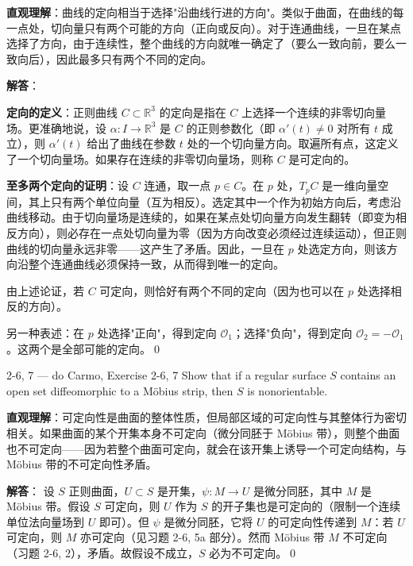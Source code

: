 \begin{solution}
\textbf{直观理解}：曲线的定向相当于选择"沿曲线行进的方向"。类似于曲面，在曲线的每一点处，切向量只有两个可能的方向（正向或反向）。对于连通曲线，一旦在某点选择了方向，由于连续性，整个曲线的方向就唯一确定了（要么一致向前，要么一致向后），因此最多只有两个不同的定向。

\textbf{解答}：

\textbf{定向的定义}：正则曲线 $C \subset \mathbb{R}^3$ 的定向是指在 $C$ 上选择一个连续的非零切向量场。更准确地说，设 $\alpha: I \to \mathbb{R}^3$ 是 $C$ 的正则参数化（即 $\alpha'(t) \neq 0$ 对所有 $t$ 成立），则 $\alpha'(t)$ 给出了曲线在参数 $t$ 处的一个切向量方向。取遍所有点，这定义了一个切向量场。如果存在连续的非零切向量场，则称 $C$ 是可定向的。

\textbf{至多两个定向的证明}：设 $C$ 连通，取一点 $p \in C$。在 $p$ 处，$T_pC$ 是一维向量空间，其上只有两个单位向量（互为相反）。选定其中一个作为初始方向后，考虑沿曲线移动。由于切向量场是连续的，如果在某点处切向量方向发生翻转（即变为相反方向），则必存在一点处切向量为零（因为方向改变必须经过连续运动），但正则曲线的切向量永远非零——这产生了矛盾。因此，一旦在 $p$ 处选定方向，则该方向沿整个连通曲线必须保持一致，从而得到唯一的定向。

由上述论证，若 $C$ 可定向，则恰好有两个不同的定向（因为也可以在 $p$ 处选择相反的方向）。

另一种表述：在 $p$ 处选择"正向"，得到定向 $\mathcal{O}_1$；选择"负向"，得到定向 $\mathcal{O}_2 = -\mathcal{O}_1$。这两个是全部可能的定向。\qed
\end{solution}

\begin{exercise}{2-6, 7 — do Carmo, Exercise 2-6, 7}
Show that if a regular surface $S$ contains an open set diffeomorphic to a Möbius strip, then $S$ is nonorientable.
\end{exercise}

\begin{solution}
\textbf{直观理解}：可定向性是曲面的整体性质，但局部区域的可定向性与其整体行为密切相关。如果曲面的某个开集本身不可定向（微分同胚于 Möbius 带），则整个曲面也不可定向——因为若整个曲面可定向，就会在该开集上诱导一个可定向结构，与 Möbius 带的不可定向性矛盾。

\textbf{解答}：
设 $S$ 正则曲面，$U \subset S$ 是开集，$\psi: M \to U$ 是微分同胚，其中 $M$ 是 Möbius 带。假设 $S$ 可定向，则 $U$ 作为 $S$ 的开子集也是可定向的（限制一个连续单位法向量场到 $U$ 即可）。但 $\psi$ 是微分同胚，它将 $U$ 的可定向性传递到 $M$：若 $U$ 可定向，则 $M$ 亦可定向（见习题 2-6, 5a 部分）。然而 Möbius 带 $M$ 不可定向（习题 2-6, 2），矛盾。故假设不成立，$S$ 必为不可定向。\qed
\end{solution}

